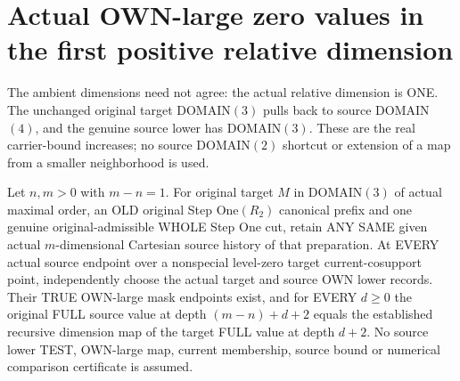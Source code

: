 \section{Actual OWN-large zero values in the first positive relative dimension}

The ambient dimensions need not agree: the actual relative dimension
is ONE. The unchanged original target DOMAIN$(3)$ pulls back to source
DOMAIN$(4)$, and the genuine source lower has DOMAIN$(3)$. These are
the real carrier-bound increases; no source DOMAIN$(2)$ shortcut or
extension of a map from a smaller neighborhood is used.

\begin{theorem}
\label{hir:original-prepared-zero-own-large-relative-one-full-values}
\leanok
Let $n,m>0$ with $m-n=1$. For original target $M$ in DOMAIN$(3)$
of actual maximal order, an OLD original Step One$(R_2)$ canonical
prefix and one genuine original-admissible WHOLE Step One cut, retain
ANY SAME given actual $m$-dimensional Cartesian source history of
that preparation. At EVERY actual source endpoint over a nonspecial
level-zero target current-cosupport point, independently choose the
actual target and source OWN lower records. Their TRUE OWN-large
mask endpoints exist, and for EVERY $d\geq0$ the original FULL source
value at depth $(m-n)+d+2$ equals the established recursive dimension
map of the target FULL value at depth $d+2$. No source lower TEST,
OWN-large map, current membership, source bound or numerical
comparison certificate is assumed.
\end{theorem}
